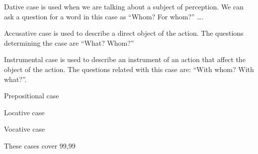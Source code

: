 Dative case is used when we are talking about a subject of perception. We can ask a question for a word in this case as “Whom? For whom?”  …. 

Accusative case is used to describe a direct object of the action. The questions determining the case are “What? Whom?”

Instrumental case is used to describe an instrument of an action that affect the object of the action. The questions related with this case are: “With whom? With what?”.

Prepositional case 

Locative case

Vocative case

These cases cover 99,99%
